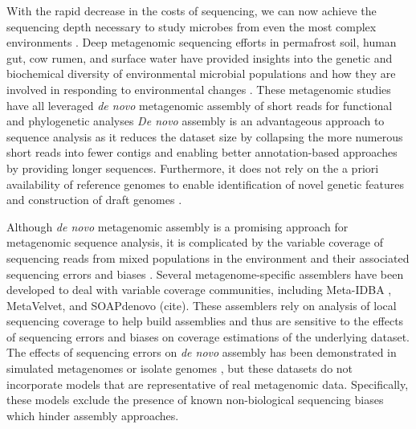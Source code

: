 \documentclass[10pt]{article}
\begin{document}
With the rapid decrease in the costs of sequencing, we can now
achieve the sequencing depth necessary to study microbes from even the most complex
environments \cite{Hess:2011p686,Qin:2010p189}.  Deep
metagenomic sequencing efforts in permafrost soil, human gut, cow
rumen, and surface water have provided insights into the genetic and
biochemical diversity of environmental microbial populations
\cite{Hess:2011p686,Iverson:2012p1281,Qin:2010p189} and how
they are involved in responding to environmental changes
\cite{Mackelprang:2011p1087}. These metagenomic studies have all
leveraged \emph{de novo} metagenomic assembly of short reads for
functional and phylogenetic analyses
\emph{De novo} assembly is
an advantageous approach to sequence analysis as it reduces the
dataset size by collapsing the more numerous short reads into fewer contigs and
enabling better annotation-based approaches by providing longer sequences.
\cite{Miller:2010p226,Pop:2009p798}
Furthermore, it does not rely on the a priori availability of
reference genomes to enable identification of novel genetic features
and construction of draft genomes \cite{Hess:2011p686,Iverson:2012p1281}.

Although \emph{de novo} metagenomic assembly is a promising approach
for metagenomic sequence analysis, it is complicated by the variable
coverage of sequencing reads from mixed populations in the environment
and their associated sequencing errors and biases
\cite{Mende:2012p1262,Pignatelli:2011p742}. Several
metagenome-specific assemblers have been developed to deal with
variable coverage communities, including Meta-IDBA
\cite{Peng:2011p898}, MetaVelvet, and SOAPdenovo (cite).  These assemblers
rely on analysis of local sequencing coverage to help build assemblies
and thus are sensitive to the effects of sequencing errors and biases
on coverage estimations of the underlying dataset. The effects of
sequencing errors on \emph{de novo} assembly has been demonstrated in
simulated metagenomes
\cite{Mavromatis:2006p894,Mende:2012p1262,Pignatelli:2011p742} or
isolate genomes \cite{Morgan:2010p740}, but these datasets do not
incorporate models that are representative of real metagenomic data.
Specifically, these models exclude the presence of known
non-biological sequencing biases
\cite{GomezAlvarez:2009p1334,Keegan:2012p1336,Niu:2010p1333} which
hinder assembly approaches.
\end{document}
